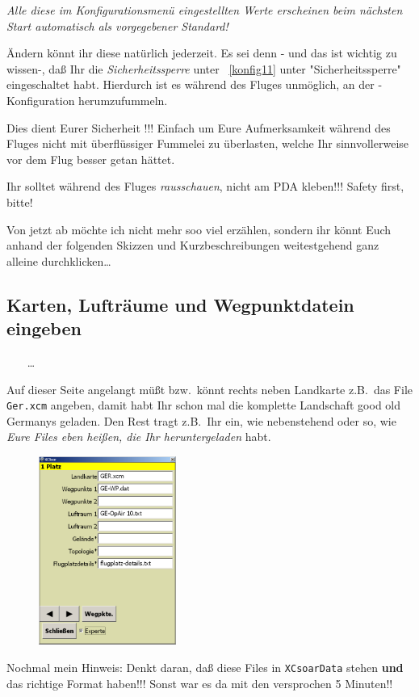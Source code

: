\merkes\textit{Alle diese im Konfigurationsmenü eingestellten Werte erscheinen beim nächsten Start automatisch als vorgegebener Standard!}

 Ändern könnt ihr diese natürlich jederzeit. Es sei denn - und das ist wichtig zu wissen-, daß Ihr die \textit{Sicherheitssperre}  unter ~\ref{konfig11} unter "Sicherheitssperre"  eingeschaltet habt.
 Hierdurch ist es während des Fluges unmöglich, an der \xc -Konfiguration herumzufummeln.

 Dies dient Eurer Sicherheit !!! Einfach um Eure Aufmerksamkeit  während des Fluges nicht mit überflüssiger Fummelei  zu überlasten, welche Ihr sinnvollerweise vor dem Flug besser getan hättet.

 Ihr solltet während des Fluges \textit{rausschauen}, nicht am PDA kleben!!! Safety first, bitte!

Von jetzt ab möchte ich nicht mehr soo viel erzählen, sondern ihr könnt Euch anhand der folgenden Skizzen und  Kurzbeschreibungen weitestgehend ganz alleine durchklicken\dots

\subsection{Karten, Lufträume und Wegpunktdatein eingeben}\label{fileseingeben}
\begin{center} \bblitz
{}\blink~\blink~\blink~ \far \far \dots \qquad {}
\end{center}

Auf dieser Seite angelangt müßt bzw.\ könnt rechts neben \textsf{Landkarte} z.B.\ das File \texttt{Ger.xcm} angeben, damit habt Ihr schon mal die komplette Landschaft good old Germanys geladen. Den Rest tragt z.B.\ Ihr ein, wie nebenstehend oder so, wie \textsl{Eure Files eben heißen, die Ihr heruntergeladen} habt.


\begin{figure}
\includegraphics[width=4.5cm]{Bilder/Konfig1Platz.png}
\end{figure}
Nochmal mein Hinweis: Denkt daran, daß diese Files in \texttt{XCsoarData} stehen \textbf{und} das richtige Format haben!!! Sonst war es da mit den versprochen 5 Minuten!!\\

